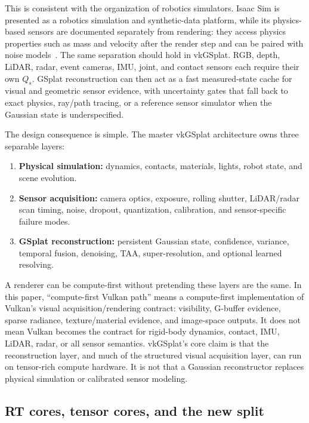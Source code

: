 \documentclass[10pt,journal,onecolumn]{IEEEtran}
\begin{document}
This is consistent with the organization of robotics simulators. Isaac
Sim is presented as a robotics simulation and synthetic-data platform,
while its physics-based sensors are documented separately from rendering:
they access physics properties such as mass and velocity after the
render step and can be paired with noise models~\cite{nvidia-isaacsim,
nvidia-isaac-physics-sensors}. The same separation should hold in
vkGSplat. RGB, depth, LiDAR, radar, event cameras, IMU, joint, and
contact sensors each require their own $Q_s$. GSplat reconstruction can
then act as a fast measured-state cache for visual and geometric sensor
evidence, with uncertainty gates that fall back to exact physics,
ray/path tracing, or a reference sensor simulator when the Gaussian
state is underspecified.

The design consequence is simple. The master vkGSplat architecture owns
three separable layers:
\begin{enumerate}
  \item \textbf{Physical simulation:} dynamics, contacts, materials,
        lights, robot state, and scene evolution.
  \item \textbf{Sensor acquisition:} camera optics, exposure, rolling
        shutter, LiDAR/radar scan timing, noise, dropout, quantization,
        calibration, and sensor-specific failure modes.
  \item \textbf{GSplat reconstruction:} persistent Gaussian state,
        confidence, variance, temporal fusion, denoising, TAA,
        super-resolution, and optional learned resolving.
\end{enumerate}
A renderer can be compute-first without pretending these layers are the
same. In this paper, ``compute-first Vulkan path'' means a compute-first
implementation of Vulkan's visual acquisition/rendering contract: visibility,
G-buffer evidence, sparse radiance, texture/material evidence, and image-space
outputs. It does not mean Vulkan becomes the contract for rigid-body dynamics,
contact, IMU, LiDAR, radar, or all sensor semantics. vkGSplat's core claim is
that the reconstruction layer, and much of the structured visual acquisition
layer, can run on tensor-rich compute hardware. It is not that a Gaussian
reconstructor replaces physical simulation or calibrated sensor modeling.

\subsection{RT cores, tensor cores, and the new split}
\end{document}
